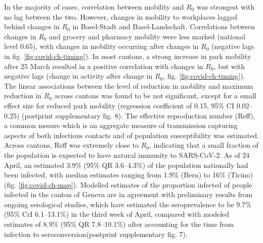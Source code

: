 In the majority of cases, correlation between mobility and $R_0$ was strongest with no lag between the two. However, changes in mobility to workplaces lagged behind changes in $R_0$ in Basel-Stadt and Basel-Landschaft. Correlations between changes in $R_0$ and grocery and pharmacy mobility were less marked (national level 0.65), with changes in mobility occurring after changes in $R_0$ (negative lags in fig. \ref{fig:covid-ch-timing}). In most cantons, a strong increase in park mobility after 25 March resulted in a positive correlation with changes in $R_0$, but with negative lags (change in activity after change in $R_0$, fig. \ref{fig:covid-ch-timing}). 
The linear associations between the level of reduction in mobility and maximum reduction in $R_0$ across cantons was found to be not significant, except for a small effect size for reduced park mobility (regression coefficient of 0.15, 95\% CI 0.02–0.25) (postprint supplementary fig. 8). 
The effective reproduction number (Reff), a common mesure which is an aggregate measure of transmission capturing aspects of both infectious contacts and of population susceptibility was estimated. Across cantons, Reff was extremely close to $R_0$, indicating that a small fraction of the population is expected to have natural immunity to SARS-CoV-2. 
As of 24 April, an estimated 3.9\% (95\% QR 3.6–4.3\%) of the population nationally had been infected, with median estimates ranging from 1.9\% (Bern) to 16\% (Ticino) (fig. \ref{fig:covid-ch-map}). 
Modelled estimates of the proportion infected of people infected in the canton of Geneva are in agreement with preliminary results from ongoing serological studies, which have estimated the seroprevalence to be 9.7\% (95\% CrI 6.1–13.1\%) in the third week of April\cite[3\baselineskip]{Stringhini:RepeatedSeroprevalenceAntiSARSCoV2:2020}, compared with modeled estimates of 8.9\% (95\% QR 7.8–10.1\%) after accounting for the time from infection to seroconversion\cite{Wolfel:VirologicalAssessmentHospitalized:2020}(postprint supplementary fig. 7).

